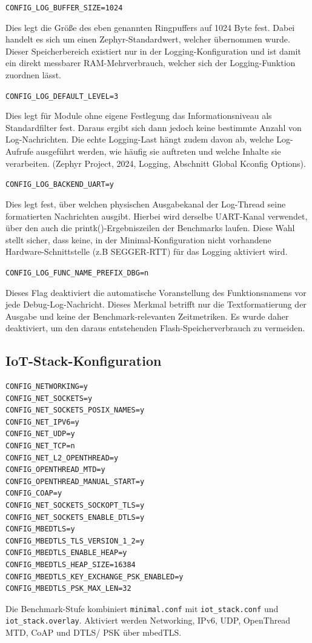 \lstinline[style=fileinline]|CONFIG_LOG_BUFFER_SIZE=1024|

Dies legt die Gr{\"o}{\ss}e des eben genannten Ringpuffers auf 1024 Byte fest. Dabei handelt es sich um einen Zephyr-Standardwert, welcher {\"u}bernommen wurde. Dieser Speicherbereich existiert nur in der Logging-Konfiguration und ist damit ein direkt messbarer RAM-Mehrverbrauch, welcher sich der Logging-Funktion zuordnen l{\"a}sst.

\lstinline[style=fileinline]|CONFIG_LOG_DEFAULT_LEVEL=3|

Dies legt f{\"u}r Module ohne eigene Festlegung das Informationsniveau als Standardfilter fest. Daraus ergibt sich dann jedoch keine bestimmte Anzahl von Log-Nachrichten. Die echte Logging-Last h{\"a}ngt zudem davon ab, welche Log-Aufrufe ausgef{\"u}hrt werden, wie h{\"a}ufig sie auftreten und welche Inhalte sie verarbeiten.  (Zephyr Project, 2024, \glqq{}Logging\grqq{}, Abschnitt \glqq{}Global Kconfig Options\grqq{}).

\lstinline[style=fileinline]|CONFIG_LOG_BACKEND_UART=y|

Dies legt fest, {\"u}ber welchen physischen Ausgabekanal der Log-Thread seine formatierten Nachrichten ausgibt. Hierbei wird derselbe UART-Kanal verwendet, {\"u}ber den auch die printk()-Ergebniszeilen der Benchmarks laufen. Diese Wahl stellt sicher, dass keine, in der Minimal-Konfiguration nicht vorhandene Hardware-Schnittstelle (z.B SEGGER-RTT) f{\"u}r das Logging aktiviert wird.

\lstinline[style=fileinline]|CONFIG_LOG_FUNC_NAME_PREFIX_DBG=n|

Dieses Flag deaktiviert die automatische Voranstellung des Funktionsnamens vor jede Debug-Log-Nachricht. Dieses Merkmal betrifft nur die Textformatierung der Ausgabe und keine der Benchmark-relevanten Zeitmetriken. Es wurde daher deaktiviert, um den daraus entstehenden Flash-Speicherverbrauch zu vermeiden.

\subsection{IoT-Stack-Konfiguration}
\begin{lstlisting}[style=basecode,language=Kconfig]
CONFIG_NETWORKING=y
CONFIG_NET_SOCKETS=y
CONFIG_NET_SOCKETS_POSIX_NAMES=y
CONFIG_NET_IPV6=y
CONFIG_NET_UDP=y
CONFIG_NET_TCP=n
CONFIG_NET_L2_OPENTHREAD=y
CONFIG_OPENTHREAD_MTD=y
CONFIG_OPENTHREAD_MANUAL_START=y
CONFIG_COAP=y
CONFIG_NET_SOCKETS_SOCKOPT_TLS=y
CONFIG_NET_SOCKETS_ENABLE_DTLS=y
CONFIG_MBEDTLS=y
CONFIG_MBEDTLS_TLS_VERSION_1_2=y
CONFIG_MBEDTLS_ENABLE_HEAP=y
CONFIG_MBEDTLS_HEAP_SIZE=16384
CONFIG_MBEDTLS_KEY_EXCHANGE_PSK_ENABLED=y
CONFIG_MBEDTLS_PSK_MAX_LEN=32
\end{lstlisting}
Die Benchmark-Stufe kombiniert \lstinline[style=fileinline]|minimal.conf| mit \lstinline[style=fileinline]|iot_stack.conf| und \lstinline[style=fileinline]|iot_stack.overlay|. Aktiviert werden Networking, IPv6, UDP, OpenThread MTD, CoAP und DTLS/ PSK {\"u}ber mbedTLS.

